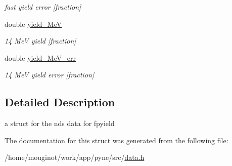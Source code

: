 \begin{DoxyCompactItemize}
\begin{DoxyCompactList}\small\item\em fast yield error \mbox{[}fraction\mbox{]} \end{DoxyCompactList}\item 
\mbox{\label{structpyne_1_1ndsfpysub_afb3737be03fedddc6f54fa3a0e59f0e8}} 
double \hyperlink{structpyne_1_1ndsfpysub_afb3737be03fedddc6f54fa3a0e59f0e8}{yield\+\_\+MeV}
\begin{DoxyCompactList}\small\item\em 14 MeV yield \mbox{[}fraction\mbox{]} \end{DoxyCompactList}\item 
\mbox{\label{structpyne_1_1ndsfpysub_a7bc2487245689a3f6a095f2254e66e99}} 
double \hyperlink{structpyne_1_1ndsfpysub_a7bc2487245689a3f6a095f2254e66e99}{yield\+\_\+Me\+V\+\_\+err}
\begin{DoxyCompactList}\small\item\em 14 MeV yield error \mbox{[}fraction\mbox{]} \end{DoxyCompactList}\end{DoxyCompactItemize}


\subsection{Detailed Description}
a struct for the nds data for fpyield 

The documentation for this struct was generated from the following file\+:\begin{DoxyCompactItemize}
\item 
/home/mouginot/work/app/pyne/src/\hyperlink{data_8h}{data.\+h}\end{DoxyCompactItemize}
